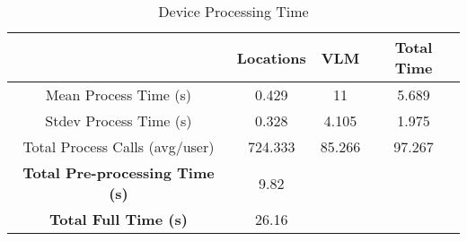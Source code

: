 \begin{table*}
    \centering
    \begin{tabular}{cccc}
        \toprule
        \textbf{} & \textbf{Locations} & \textbf{VLM} & \textbf{Total Time}\\
        \midrule
        Mean Process Time (s) & 0.429 & 11 & 5.689\\
        Stdev Process Time (s)  & 0.328 & 4.105 & 1.975\\
        Total Process Calls (avg/user) & 724.333 & 85.266 & 97.267\\
        \midrule
        \textbf{Total Pre-processing Time (s)} & 9.82\\
        \textbf{Total Full Time (s)} & 26.16\\
        \bottomrule
    \end{tabular}
    \caption{Device Processing Time}
    \label{tab:processtime}
\end{table*}